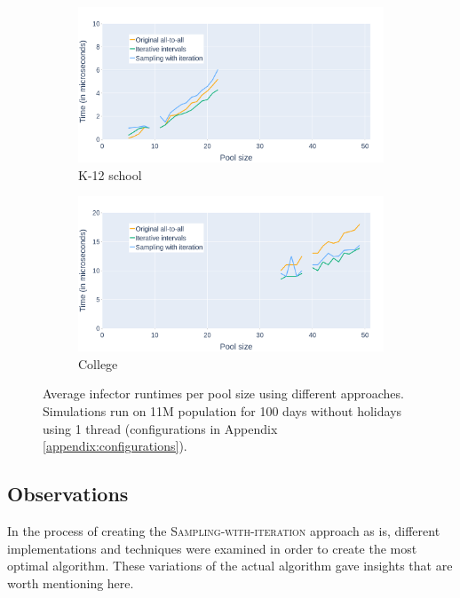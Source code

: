 \begin{figure}\ContinuedFloat
    \centering
    \begin{subfigure}{.8\linewidth}
        \centering
        \includegraphics[width=\textwidth]{4 - Sampling/fig/sampling_with_iteration/times_avg_swi_pType_k12school.png}
        \caption{K-12 school}
        \label{fig:times_avg_swi_pType_k12school}
    \end{subfigure}
    \begin{subfigure}{.8\linewidth}
        \centering
        \includegraphics[width=\textwidth]{4 - Sampling/fig/sampling_with_iteration/times_avg_swi_pType_college.png}
        \caption{College}
        \label{fig:times_avg_swi_pType_college}
    \end{subfigure}
    \caption{Average infector runtimes per pool size using different approaches. Simulations run on 11M population for 100 days without holidays using 1 thread (configurations in Appendix \ref{appendix:configurations}).}
    \label{fig:times_avg_swi_pType}
\end{figure}

\subsection{Observations}
\label{subsec:observations_swi}
In the process of creating the \textsc{Sampling-with-iteration} approach as is, different implementations and techniques were examined in order to create the most optimal algorithm. These variations of the actual algorithm gave insights that are worth mentioning here.

